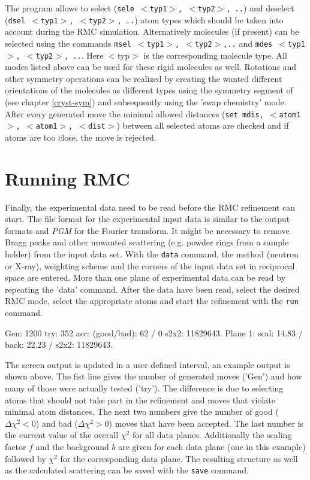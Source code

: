 %
The program allows to select ({\tt sele $<$typ1$>$, $<$typ2$>$, ..})
and deselect ({\tt dsel $<$typ1$>$, $<$typ2$>$, ..}) atom types
which should be taken into account during the RMC simulation.
Alternatively molecules (if present) can be selected using the
commands {\tt msel $<$typ1$>$, $<$typ2$>$,..} and {\tt mdes
$<$typ1$>$, $<$typ2$>$, ..}. Here $<$typ$>$ is the corresponding
molecule type. All modes listed above can be used for these rigid
molecules as well.  Rotations and other symmetry operations can be
realized by creating the wanted different orientations of the
molecules as different types using the symmetry segment of 
\Discus (see chapter \ref{cryst-sym}) and subsequently using the
'swap chemistry' mode. After every generated move the minimal
allowed distances ({\tt set mdis, $<$atom1$>$, $<$atom1$>$,
$<$dist$>$}) between all selected atoms are checked and if atoms are
too close, the move is rejected.


\section{Running RMC \label{rmc-run}}

Finally, the experimental data need to be read before the RMC
refinement can start.  The file format for the experimental input
data is similar to the output formats \Kuplot and {\it PGM} for
the Fourier transform.  It might be necessary to remove Bragg peaks
and other unwanted scattering (e.g.  powder rings from a sample
holder) from the input data set. With the {\tt data} command, the
method (neutron or X-ray), weighting scheme and the corners of the
input data set in reciprocal space are entered.  More than one plane
of experimental data can be read by repeating the 'data' command.
After the data have been read, select the desired RMC mode, select
the appropriate atoms and start the refinement with the {\tt run}
command.
%

\begin{MacVerbatim}
   Gen:   1200 try:    352 acc: (good/bad):     62 /      0 s2x2:   11829643.
     Plane  1: scal:  14.83     / back:  22.23     / s2x2:          11829643.
\end{MacVerbatim}
%
The screen output is updated in a user defined interval, an example
output is shown above.  The fist line gives the number of generated
moves ('Gen') and how many of those were actually tested ('try').
The difference is due to selecting atoms that should not take part
in the refinement and moves that violate minimal atom distances. The
next two numbers give the number of good ($\Delta \chi^{2} < 0$) and
bad ($\Delta \chi^{2} > 0$) moves that have been accepted.  The last
number is the current value of the overall $\chi^{2}$ for all data
planes.  Additionally the scaling factor $f$ and the background $b$
are given for each data plane (one in this example) followed by
$\chi^{2}$ for the corresponding data plane.  The resulting
structure as well as the calculated scattering can be saved with the
{\tt save} command.

